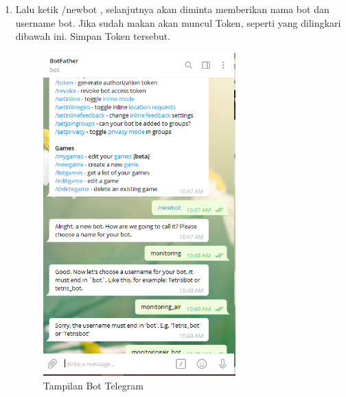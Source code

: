 \begin{enumerate}
\begin{enumerate}
    \item Lalu ketik /newbot , selanjutnya akan diminta memberikan nama bot dan username bot. Jika sudah makan akan muncul Token, seperti yang dilingkari dibawah ini. Simpan Token tersebut.
    \begin{figure}[H]
    \centering
    \includegraphics[width=0.7\textwidth]{figures/bot3.png}
    \caption{Tampilan Bot Telegram}
    \label{print}
    \end{figure}
     \begin{figure}[H]
    \centering

\end{figure}
\end{enumerate}
\end{enumerate}
